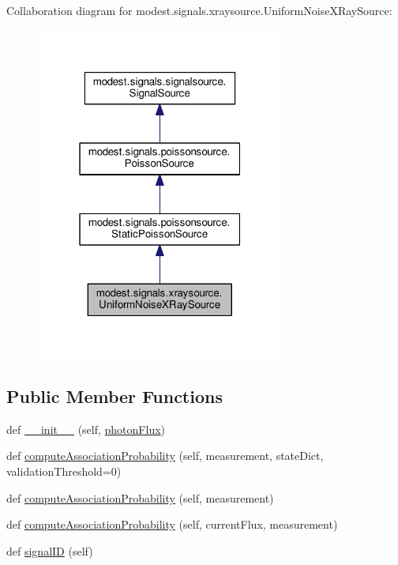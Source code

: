 Collaboration diagram for modest.\+signals.\+xraysource.\+Uniform\+Noise\+X\+Ray\+Source\+:\nopagebreak
\begin{figure}[H]
\begin{center}
\leavevmode
\includegraphics[width=232pt]{classmodest_1_1signals_1_1xraysource_1_1UniformNoiseXRaySource__coll__graph}
\end{center}
\end{figure}
\subsection*{Public Member Functions}
\begin{DoxyCompactItemize}
\item 
def \hyperlink{classmodest_1_1signals_1_1xraysource_1_1UniformNoiseXRaySource_a2bf2964e92d4540de35c6eebfe4944db}{\+\_\+\+\_\+init\+\_\+\+\_\+} (self, \hyperlink{classmodest_1_1signals_1_1xraysource_1_1UniformNoiseXRaySource_a9b8049972baf6e0640181b58850a3d20}{photon\+Flux})
\item 
def \hyperlink{classmodest_1_1signals_1_1xraysource_1_1UniformNoiseXRaySource_aa4732c82202fd8c607ae0f8244be3272}{compute\+Association\+Probability} (self, measurement, state\+Dict, validation\+Threshold=0)
\item 
def \hyperlink{classmodest_1_1signals_1_1poissonsource_1_1StaticPoissonSource_a1754d94bff46d97817438bab552afef9}{compute\+Association\+Probability} (self, measurement)
\item 
def \hyperlink{classmodest_1_1signals_1_1poissonsource_1_1PoissonSource_a2f8a73e6f51cbdcd0f1e646d6f4d4574}{compute\+Association\+Probability} (self, current\+Flux, measurement)
\item 
def \hyperlink{classmodest_1_1signals_1_1signalsource_1_1SignalSource_a9a64c6a9c2954f6ad61e4ca3518ea8ab}{signal\+ID} (self)
\end{DoxyCompactItemize}
